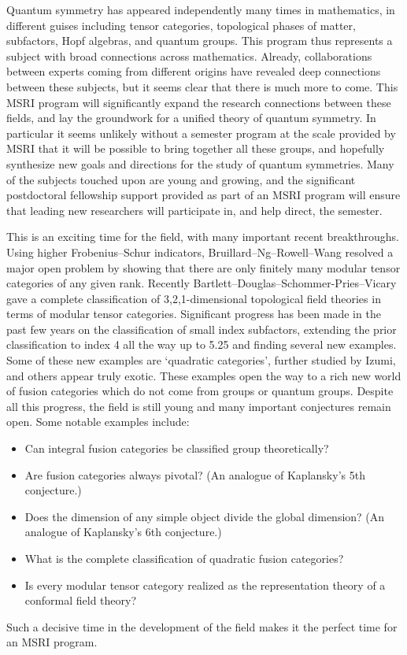 \documentclass[12pt]{article}
\begin{document}
Quantum symmetry has appeared independently many times in mathematics, in different guises including tensor categories, topological phases of matter, subfactors, Hopf algebras, and quantum groups. This program thus represents a subject with broad connections across mathematics. Already, collaborations between experts coming from different origins have revealed deep connections between these subjects, but it seems clear that there is much more to come. This MSRI program will significantly expand the research connections between these fields, and lay the groundwork for a unified theory of quantum symmetry. In particular it seems unlikely without a semester program at the scale provided by MSRI that it will be possible to bring together all these groups, and hopefully synthesize new goals and directions for the study of quantum symmetries. Many of the subjects touched upon are young and growing, and the significant postdoctoral fellowship support provided as part of an MSRI program will ensure that leading new researchers will participate in, and help direct, the semester.


This is an exciting time for the field, with many important recent breakthroughs. Using higher Frobenius--Schur indicators, Bruillard--Ng--Rowell--Wang resolved a major open problem by showing that there are only finitely many modular tensor categories of any given rank. Recently Bartlett--Douglas--Schommer-Pries--Vicary gave a complete classification of 3,2,1-dimensional topological field theories in terms of modular tensor categories. Significant progress has been made in the past few years on the classification of small index subfactors, extending the prior classification to index 4 all the way up to 5.25 and finding several new examples. Some of these new examples are `quadratic categories', further studied by Izumi, and others appear truly exotic. These examples open the way to a rich new world of fusion categories which do not come from groups or quantum groups.  Despite all this progress, the field is still young and many important conjectures remain open. Some notable examples include:
\begin{itemize}
  \setlength{\itemsep}{1pt}
  \setlength{\parskip}{0pt}
  \setlength{\parsep}{0pt}
\item Can integral fusion categories be classified group theoretically?
\item Are fusion categories always pivotal? (An analogue of Kaplansky's 5th conjecture.)
\item Does the dimension of any simple object divide the global dimension? (An analogue of Kaplansky's 6th conjecture.)
\item What is the complete classification of quadratic fusion categories?
\item Is every modular tensor category realized as the representation theory of a conformal field theory?
\end{itemize}
Such a decisive time in the development of the field makes it the perfect time for an MSRI program.
\end{document}
